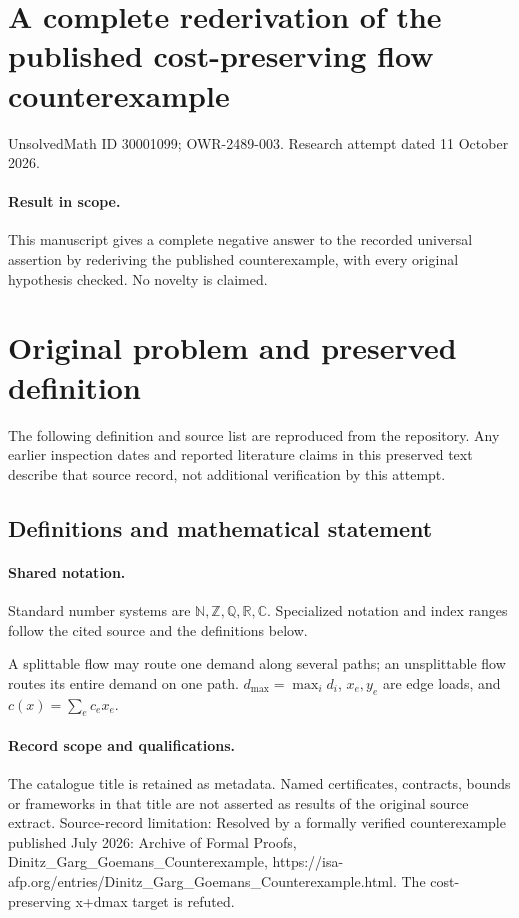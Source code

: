 \documentclass[11pt]{article}
\begin{document}
\section*{A complete rederivation of the published cost-preserving flow counterexample}
\noindent UnsolvedMath ID 30001099; OWR-2489-003. Research attempt dated 11 October 2026.
\paragraph{Result in scope.}This manuscript gives a complete negative answer to the recorded universal assertion by rederiving the published counterexample, with every original hypothesis checked. No novelty is claimed.
\section{Original problem and preserved definition}
The following definition and source list are reproduced from the repository. Any earlier inspection dates and reported literature claims in this preserved text describe that source record, not additional verification by this attempt.
\subsection{Definitions and mathematical statement}

\paragraph{Shared notation.}Standard number systems are $\mathbb N,\mathbb Z,\mathbb Q,\mathbb R,\mathbb C$. Specialized notation and index ranges follow the cited source and the definitions below.


A splittable flow may route one demand along several paths; an unsplittable flow routes its entire demand on one path. $d_{\max}=\max_i d_i$, $x_e,y_e$ are edge loads, and $c(x)=\sum_e c_e x_e$.
\paragraph{Record scope and qualifications.}
The catalogue title is retained as metadata. Named certificates, contracts, bounds or frameworks in that title are not asserted as results of the original source extract.
Source-record limitation: Resolved by a formally verified counterexample published July 2026: Archive of Formal Proofs, Dinitz_Garg_Goemans_Counterexample, https://isa-afp.org/entries/Dinitz_Garg_Goemans_Counterexample.html. The cost-preserving x+dmax target is refuted.
\end{document}
